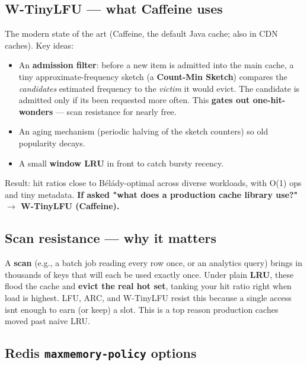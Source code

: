\documentclass[11pt]{article}
\providecommand{\tightlist}{\setlength{\itemsep}{1pt}\setlength{\parskip}{0pt}}
\begin{document}
\subsection{W-TinyLFU --- what Caffeine uses}\label{w-tinylfu--what-caffeine-uses}

The modern state of the art (Caffeine, the default Java cache; also in CDN caches). Key ideas:

\begin{itemize}
\tightlist
\item
  An \textbf{admission filter}: before a new item is admitted into the main cache, a tiny approximate-frequency sketch (a \textbf{Count-Min Sketch}) compares the \emph{candidate\textquotesingle s} estimated frequency to the \emph{victim} it would evict. The candidate is admitted only if it\textquotesingle s been requested more often. This \textbf{gates out one-hit-wonders} --- scan resistance for nearly free.
\item
  An aging mechanism (periodic halving of the sketch counters) so old popularity decays.
\item
  A small \textbf{window LRU} in front to catch bursty recency.
\end{itemize}

Result: hit ratios close to Bélády-optimal across diverse workloads, with O(1) ops and tiny metadata. \textbf{If asked "what does a production cache library use?" \(\rightarrow\) W-TinyLFU (Caffeine).}

\subsection{Scan resistance --- why it matters}\label{scan-resistance--why-it-matters}

A \textbf{scan} (e.g., a batch job reading every row once, or an analytics query) brings in thousands of keys that will each be used exactly once. Under plain \textbf{LRU}, these flood the cache and \textbf{evict the real hot set}, tanking your hit ratio right when load is highest. LFU, ARC, and W-TinyLFU resist this because a single access isn\textquotesingle t enough to earn (or keep) a slot. This is a top reason production caches moved past naive LRU.

\subsection{\texorpdfstring{Redis \texttt{maxmemory-policy} options}{Redis maxmemory-policy options}}\label{redis-maxmemory-policy-options}
\end{document}
